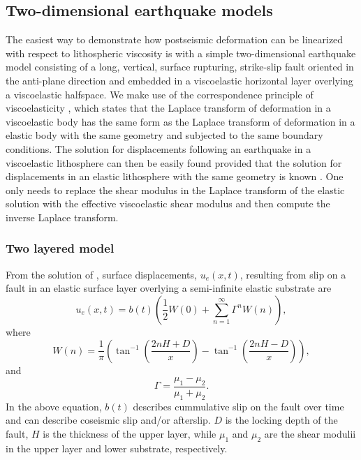 \documentclass[extra]{gji}
\begin{document}
\subsection{Two-dimensional earthquake models}
The easiest way to demonstrate how postseismic deformation can be
linearized with respect to lithospheric viscosity is with a simple
two-dimensional earthquake model consisting of a long, vertical,
surface rupturing, strike-slip fault oriented in the anti-plane
direction and embedded in a viscoelastic horizontal layer overlying a
viscoelastic halfspace.  We make use of the correspondence principle
of viscoelasticity \citep[e.g.][]{F1975}, which states that the
Laplace transform of deformation in a viscoelastic body has the same
form as the Laplace transform of deformation in a elastic body with
the same geometry and subjected to the same boundary conditions. The
solution for displacements following an earthquake in a viscoelastic
lithosphere can then be easily found provided that the solution for
displacements in an elastic lithosphere with the same geometry is known
\citep[e.g.][]{HH2005,NM1974,SP1978}.  One only needs to replace the
shear modulus in the Laplace transform of the elastic solution with
the effective viscoelastic shear modulus and then compute the inverse
Laplace transform.

\subsubsection{Two layered model}
From the solution of \citet{R1971}, surface displacements,
$u_{e}(x,t)$, resulting from slip on a fault in an elastic surface
layer overlying a semi-infinite elastic substrate are
\begin{equation}\label{TwoLayerElastic}
  u_{e}(x,t) = b(t)\left(\frac{1}{2} W(0) + 
    \sum_{n=1}^\infty \Gamma^nW(n)\right),
\end{equation}
where
\begin{equation}
  W(n) = \frac{1}{\pi}\left(\tan^{-1}\left(\frac{2nH + D}{x}\right) 
    - \tan^{-1}\left(\frac{2nH - D}{x}\right)\right),
\end{equation}
and
\begin{equation}
  \Gamma = \frac{\mu_1 - \mu_2}{\mu_1 + \mu_2}.
\end{equation}
In the above equation, $b(t)$ describes cummulative slip on the fault
over time and can describe coseismic slip and/or afterslip. $D$ is the
locking depth of the fault, $H$ is the thickness of the upper layer,
while $\mu_1$ and $\mu_2$ are the shear modulii in the upper layer and
lower substrate, respectively.
\end{document}
